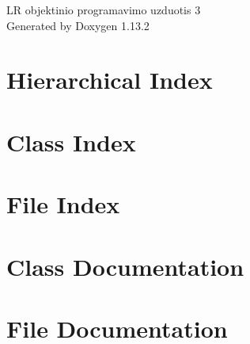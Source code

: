 \documentclass[twoside]{book}
\newcommand{\+}{\discretionary{\mbox{\scriptsize$\hookleftarrow$}}{}{}}
\newcommand{\clearemptydoublepage}{%
    \newpage{\pagestyle{empty}\cleardoublepage}%
  }
\begin{document}
  \raggedbottom
    \hypersetup{pageanchor=false,
                bookmarksnumbered=true,
                pdfencoding=unicode
               }
  \begin{titlepage}
  \vspace*{7cm}
  \begin{center}%
  {\Large LR objektinio programavimo uzduotis 3}\\
  \vspace*{1cm}
  {\large Generated by Doxygen 1.13.2}\\
  \end{center}
  \end{titlepage}
  \clearemptydoublepage
  \tableofcontents
  \clearemptydoublepage
  \hypersetup{pageanchor=true}

\chapter{Hierarchical Index}

\chapter{Class Index}

\chapter{File Index}

\chapter{Class Documentation}



\chapter{File Documentation}



  \backmatter
  \newpage
  \clearemptydoublepage
  \printindex
\end{document}

